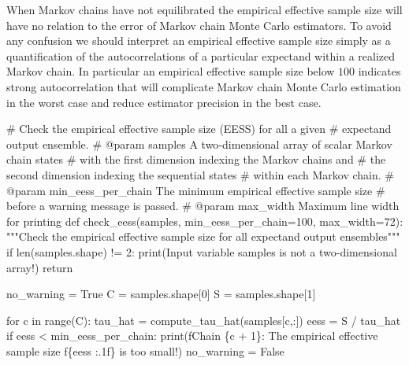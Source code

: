 \documentclass[
  letterpaper,
  DIV=11,
  numbers=noendperiod]{scrartcl}
\newenvironment{Shaded}{\begin{snugshade}}{\end{snugshade}}
\newcommand{\BuiltInTok}[1]{\textcolor[rgb]{0.00,0.23,0.31}{#1}}
\newcommand{\CommentTok}[1]{\textcolor[rgb]{0.37,0.37,0.37}{#1}}
\newcommand{\ControlFlowTok}[1]{\textcolor[rgb]{0.00,0.23,0.31}{#1}}
\newcommand{\DecValTok}[1]{\textcolor[rgb]{0.68,0.00,0.00}{#1}}
\newcommand{\KeywordTok}[1]{\textcolor[rgb]{0.00,0.23,0.31}{#1}}
\newcommand{\NormalTok}[1]{\textcolor[rgb]{0.00,0.23,0.31}{#1}}
\newcommand{\OperatorTok}[1]{\textcolor[rgb]{0.37,0.37,0.37}{#1}}
\newcommand{\SpecialCharTok}[1]{\textcolor[rgb]{0.37,0.37,0.37}{#1}}
\newcommand{\SpecialStringTok}[1]{\textcolor[rgb]{0.13,0.47,0.30}{#1}}
\newcommand{\StringTok}[1]{\textcolor[rgb]{0.13,0.47,0.30}{#1}}
\newcommand{\VariableTok}[1]{\textcolor[rgb]{0.07,0.07,0.07}{#1}}
\begin{document}
When Markov chains have not equilibrated the empirical effective sample
size will have no relation to the error of Markov chain Monte Carlo
estimators. To avoid any confusion we should interpret an empirical
effective sample size simply as a quantification of the autocorrelations
of a particular expectand within a realized Markov chain. In particular
an empirical effective sample size below \(100\) indicates strong
autocorrelation that will complicate Markov chain Monte Carlo estimation
in the worst case and reduce estimator precision in the best case.

\begin{Shaded}
\begin{Highlighting}[]

\CommentTok{\# Check the empirical effective sample size (EESS) for all a given }
\CommentTok{\# expectand output ensemble.}
\CommentTok{\# @param samples A two{-}dimensional array of scalar Markov chain states }
\CommentTok{\#                with the first dimension indexing the Markov chains and }
\CommentTok{\#                the second dimension indexing the sequential states }
\CommentTok{\#                within each Markov chain.}
\CommentTok{\# @param min\_eess\_per\_chain The minimum empirical effective sample size}
\CommentTok{\#                           before a warning message is passed.}
\CommentTok{\# @param max\_width Maximum line width for printing}
\KeywordTok{def}\NormalTok{ check\_eess(samples, min\_eess\_per\_chain}\OperatorTok{=}\DecValTok{100}\NormalTok{, max\_width}\OperatorTok{=}\DecValTok{72}\NormalTok{):}
  \CommentTok{"""Check the empirical effective sample size for all expectand }
\CommentTok{     output ensembles"""}
  \ControlFlowTok{if} \BuiltInTok{len}\NormalTok{(samples.shape) }\OperatorTok{!=} \DecValTok{2}\NormalTok{:}
    \BuiltInTok{print}\NormalTok{(}\StringTok{\textquotesingle{}Input variable \textasciigrave{}samples\textasciigrave{} is not a two{-}dimensional array!\textquotesingle{}}\NormalTok{)}
    \ControlFlowTok{return}
  
\NormalTok{  no\_warning }\OperatorTok{=} \VariableTok{True}
\NormalTok{  C }\OperatorTok{=}\NormalTok{ samples.shape[}\DecValTok{0}\NormalTok{]}
\NormalTok{  S }\OperatorTok{=}\NormalTok{ samples.shape[}\DecValTok{1}\NormalTok{]}
  
  \ControlFlowTok{for}\NormalTok{ c }\KeywordTok{in} \BuiltInTok{range}\NormalTok{(C):}
\NormalTok{    tau\_hat }\OperatorTok{=}\NormalTok{ compute\_tau\_hat(samples[c,:])}
\NormalTok{    eess }\OperatorTok{=}\NormalTok{ S }\OperatorTok{/}\NormalTok{ tau\_hat}
    \ControlFlowTok{if}\NormalTok{ eess }\OperatorTok{\textless{}}\NormalTok{ min\_eess\_per\_chain:}
      \BuiltInTok{print}\NormalTok{(}\SpecialStringTok{f\textquotesingle{}Chain }\SpecialCharTok{\{}\NormalTok{c }\OperatorTok{+} \DecValTok{1}\SpecialCharTok{\}}\SpecialStringTok{: The empirical effective sample size \textquotesingle{}}
            \SpecialStringTok{f\textquotesingle{}}\SpecialCharTok{\{}\NormalTok{eess }\SpecialCharTok{:.1f\}}\SpecialStringTok{ is too small!\textquotesingle{}}\NormalTok{)}
\NormalTok{      no\_warning }\OperatorTok{=} \VariableTok{False}
  

\end{Highlighting}
\end{Shaded}
\end{document}
